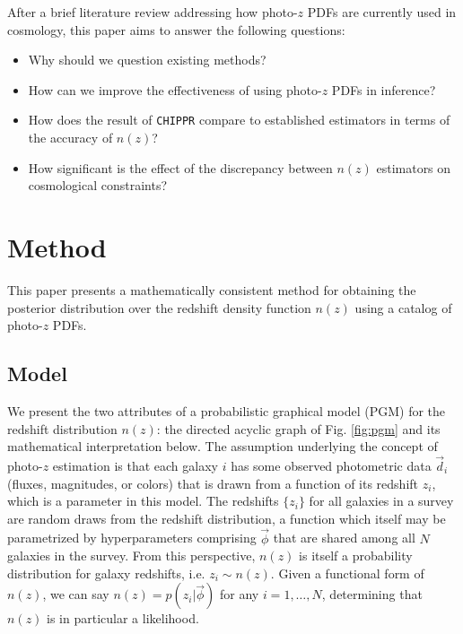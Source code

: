 \documentclass[iop]{emulateapj}
\newcommand{\chippr}{\texttt{CHIPPR} }
\begin{document}
After a brief literature review addressing how photo-$z$ PDFs are currently used in cosmology, this paper aims to answer the following questions:

\begin{itemize}
	\item Why should we question existing methods?
	\item How can we improve the effectiveness of using photo-$z$ PDFs in inference?
	\item How does the result of \chippr compare to established estimators in terms of the accuracy of $n(z)$?
	\item How significant is the effect of the discrepancy between $n(z)$ estimators on cosmological constraints?
\end{itemize}

\section{Method}
\label{sec:method}

This paper presents a mathematically consistent method for obtaining the posterior distribution over the redshift density function $n(z)$ using a catalog of photo-$z$ PDFs.

\subsection{Model}
\label{sec:model}

We present the two attributes of a probabilistic graphical model (PGM) for the redshift distribution $n(z)$: the directed acyclic graph of Fig. \ref{fig:pgm} and its mathematical interpretation below.  The assumption underlying the concept of photo-$z$ estimation is that each galaxy $i$ has some observed photometric data $\vec{d}_{i}$ (fluxes, magnitudes, or colors) that is drawn from a function of its redshift $z_{i}$, which is a parameter in this model.  The redshifts $\{z_{i}\}$ for all galaxies in a survey are random draws from the redshift distribution, a function which itself may be parametrized by hyperparameters comprising $\vec{\phi}$ that are shared among all $N$ galaxies in the survey.  From this perspective, $n(z)$ is itself a probability distribution for galaxy redshifts, i.e. $z_{i} \sim n(z)$.  Given a functional form of $n(z)$, we can say $n(z) = p(z_{i}|\vec{\phi})$ for any $i = 1, \dots, N$, determining that $n(z)$ is in particular a likelihood.  
\end{document}
